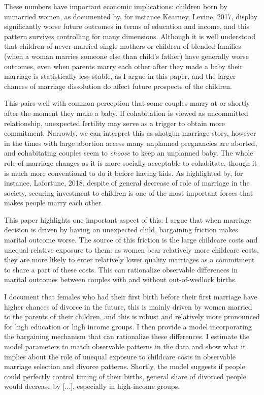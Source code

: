 \documentclass[12pt,letter]{article}
\begin{document}
These numbers have important economic implications: children born by unmarried women, as documented by, for instance Kearney, Levine, 2017, display significantly worse future outcomes in terms of education and income, and this pattern survives controlling for many dimensions. Although it is well understood that children of never married single mothers or children of blended families (when a woman marries someone else than child's father) have generally worse outcomes, even when parents marry each other after they made a baby their marriage is statistically less stable, as I argue in this paper, and the larger chances of marriage dissolution do affect future prospects of the children. 

This pairs well with common perception that some couples marry at or shortly after the moment they make a baby. If cohabitation is viewed as uncommitted relationship, unexpected fertility may serve as a trigger to obtain more commitment. Narrowly, we can interpret this as shotgun marriage story, however in the times with large abortion access many unplanned pregnancies are aborted, and cohabitating couples seem to \emph{choose} to keep an unplanned baby. The whole role of marriage changes as it is more socially acceptable to cohabitate, though it is much more conventional to do it before having kids. As highlighted by, for instance, Lafortune, 2018, despite of general decrease of role of marriage in the society, securing investment to children is one of the most important forces that makes people marry each other.

This paper highlights one important aspect of this: I argue that when marriage decision is driven by having an unexpected child, bargaining friction makes marital outcome worse. The source of this friction is the large childcare costs and unequal relative exposure to them: as women bear relatively more childcare costs, they are more likely to enter relatively lower quality marriages as a commitment to share a part of these costs. This can rationalize observable differences in marital outcomes between couples with and without out-of-wedlock births. 

I document that females who had their first birth before their first marriage have higher chances of divorce in the future, this is mainly driven by women married to the parents of their children, and this is robust and relatively more pronounced for high education or high income groups. I then provide a model incorporating the bargaining mechanism that can rationalize these differences. I estimate the model parameters to match observable patterns in the data and show what it implies about the role of unequal exposure to childcare costs in observable marriage selection and divorce patterns. Shortly, the model suggests if people could perfectly control timing of their births, general share of divorced people would decrease by [...], especially in high-income groups.
\end{document}
